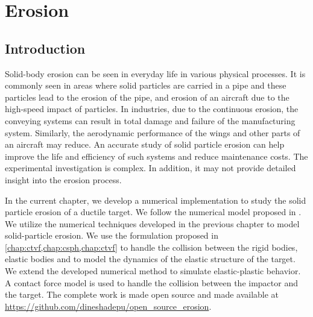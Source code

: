 \chapter{Erosion}
\label{chap:erosion}

\section{Introduction}
\label{sec:intro}
Solid-body erosion can be seen in everyday life in various physical processes.
It is commonly seen in areas where solid particles are carried in a pipe and
these particles lead to the erosion of the pipe, and erosion of an aircraft due
to the high-speed impact of particles. In industries, due to the continuous
erosion, the conveying systems can result in total damage and failure of the
manufacturing system. Similarly, the aerodynamic performance of the wings and
other parts of an aircraft may reduce. An accurate study of solid particle
erosion can help improve the life and efficiency of such systems and reduce
maintenance costs. The experimental investigation is complex. In addition, it
may not provide detailed insight into the erosion process.

In the current chapter, we develop a numerical implementation to study the solid
particle erosion of a ductile target. We follow the numerical model proposed in
\parencite{takaffoli2009finite,dong2016smoothed}. We utilize the numerical
techniques developed in the previous chapter to model solid-particle erosion. We
use the formulation proposed in \cref{chap:ctvf,chap:csph,chap:ctvf} to handle
the collision between the rigid bodies, elastic bodies and to model the dynamics
of the elastic structure of the target. We extend the developed numerical method
to simulate elastic-plastic behavior. A contact force model is used to handle
the collision between the impactor and the target. The complete work is made
open source and made available at
\url{https://github.com/dineshadepu/open_source_erosion}.

